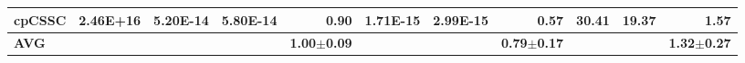 \documentclass[encoding=utf8,british]{tumphthesis}
\begin{document}
\begin{table}[H]
\begin{subtable}{1\textwidth}
{\begin{tabular}{|l|r|rrr|rrr|rrr|}
\rowcolor[HTML]{CFE2F3} 
\textbf{cpCSSC}  & 2.46E+16                                     & 5.20E-14                                           & 5.80E-14                                            & \textbf{0.90}                                    & 1.71E-15                                           & 2.99E-15                                            & \textbf{0.57}                                    & 30.41                                              & 19.37                                               & \textbf{1.57}                                    \\ \hline
\textbf{AVG}                             &                                                      &                                                       &                            & \textbf{1.00$\pm$0.09}                                                     &                                                       &                            &   \textbf{0.79$\pm$0.17}                                                   &                                                       &  & \textbf{1.32$\pm$0.27}                          \\ \hline
\end{tabular}}
\end{subtable}


\end{table}
\end{document}
